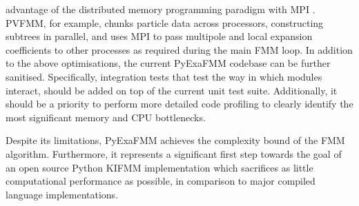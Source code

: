 advantage of the distributed memory programming paradigm with \gls{MPI} \cite{Malhotra:2015:CCP}.
PVFMM, for example, chunks particle data across processors, constructing subtrees in parallel,
and uses \gls{MPI} to pass multipole and local expansion coefficients to other processes
as required during the main \gls{FMM} loop. In addition to the above optimisations,
the current \gls{PyExaFMM} codebase can be further sanitised. Specifically, integration tests
that test the way in which modules interact, should be added on top of the current
unit test suite. Additionally, it should be a priority to perform more
detailed code profiling to clearly identify the most significant memory and
 \gls{CPU} bottlenecks.

Despite its limitations, \gls{PyExaFMM} achieves the complexity bound of the
\gls{FMM} algorithm. Furthermore, it represents a significant first step towards the goal
of an open source Python \gls{KIFMM} implementation which sacrifices as little
computational performance as possible, in comparison to major compiled language
implementations.
